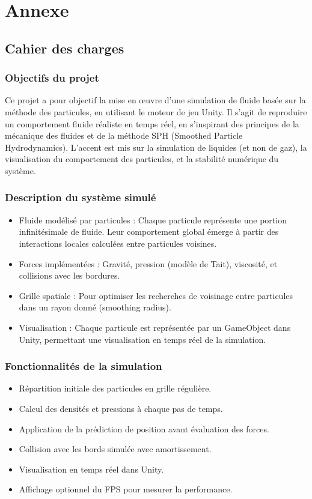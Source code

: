 \documentclass{article}
\begin{document}
\section{Annexe}
\subsection{Cahier des charges}
\subsubsection{Objectifs du projet}
Ce projet a pour objectif la mise en œuvre d’une simulation de fluide basée sur la méthode des particules, en utilisant le moteur de jeu Unity. Il s’agit de reproduire un comportement fluide réaliste en temps réel, en s’inspirant des principes de la mécanique des fluides et de la méthode SPH (Smoothed Particle Hydrodynamics). L’accent est mis sur la simulation de liquides (et non de gaz), la visualisation du comportement des particules, et la stabilité numérique du système.
\subsubsection{Description du système simulé}
\begin{itemize}

\item Fluide modélisé par particules : Chaque particule représente une portion infinitésimale de fluide. Leur comportement global émerge à partir des interactions locales calculées entre particules voisines.
\item Forces implémentées : Gravité, pression (modèle de Tait), viscosité, et collisions avec les bordures.
\item Grille spatiale : Pour optimiser les recherches de voisinage entre particules dans un rayon donné (smoothing radius).
\item Visualisation : Chaque particule est représentée par un GameObject dans Unity, permettant une visualisation en temps réel de la simulation.
\end{itemize}

\subsubsection{Fonctionnalités de la simulation}

\begin{itemize}
\item Répartition initiale des particules en grille régulière.
\item Calcul des densités et pressions à chaque pas de temps.
\item Application de la prédiction de position avant évaluation des forces.
\item Collision avec les bords simulée avec amortissement.
\item Visualisation en temps réel dans Unity.
\item Affichage optionnel du FPS pour mesurer la performance.
\end{itemize}
\end{document}

